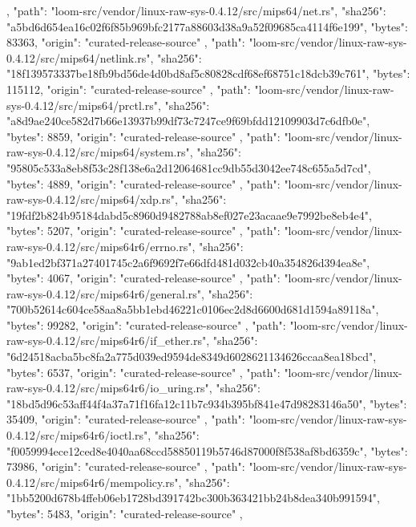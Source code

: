{{    },
    {
      "path": "loom-src/vendor/linux-raw-sys-0.4.12/src/mips64/net.rs",
      "sha256": "a5bd6d654ea16c02f6f85b969bfc2177a88603d38a9a52f09685ca4114f6e199",
      "bytes": 83363,
      "origin": "curated-release-source"
    },
    {
      "path": "loom-src/vendor/linux-raw-sys-0.4.12/src/mips64/netlink.rs",
      "sha256": "18f139573337be18fb9bd56de4d0bd8af5c80828cdf68ef68751c18dcb39c761",
      "bytes": 115112,
      "origin": "curated-release-source"
    },
    {
      "path": "loom-src/vendor/linux-raw-sys-0.4.12/src/mips64/prctl.rs",
      "sha256": "a8d9ae240ce582d7b66e13937b99df73c7247ce9f69bfdd12109903d7c6dfb0e",
      "bytes": 8859,
      "origin": "curated-release-source"
    },
    {
      "path": "loom-src/vendor/linux-raw-sys-0.4.12/src/mips64/system.rs",
      "sha256": "95805c533a8eb8f53c28f138e6a2d12064681cc9db55d3042ee748c655a5d7cd",
      "bytes": 4889,
      "origin": "curated-release-source"
    },
    {
      "path": "loom-src/vendor/linux-raw-sys-0.4.12/src/mips64/xdp.rs",
      "sha256": "19fdf2b824b95184dabd5c8960d9482788ab8ef027e23acaae9e7992be8eb4e4",
      "bytes": 5207,
      "origin": "curated-release-source"
    },
    {
      "path": "loom-src/vendor/linux-raw-sys-0.4.12/src/mips64r6/errno.rs",
      "sha256": "9ab1ed2bf371a27401745c2a6f9692f7e66dfd481d032cb40a354826d394ea8e",
      "bytes": 4067,
      "origin": "curated-release-source"
    },
    {
      "path": "loom-src/vendor/linux-raw-sys-0.4.12/src/mips64r6/general.rs",
      "sha256": "700b52614c604ce58aa8a5bb1ebd46221c0106ec2d8d6600d681d1594a89118a",
      "bytes": 99282,
      "origin": "curated-release-source"
    },
    {
      "path": "loom-src/vendor/linux-raw-sys-0.4.12/src/mips64r6/if_ether.rs",
      "sha256": "6d24518acba5bc8fa2a775d039ed9594de8349d6028621134626ccaa8ea18bcd",
      "bytes": 6537,
      "origin": "curated-release-source"
    },
    {
      "path": "loom-src/vendor/linux-raw-sys-0.4.12/src/mips64r6/io_uring.rs",
      "sha256": "18bd5d96c53aff44f4a37a71f16fa12c11b7c934b395bf841e47d98283146a50",
      "bytes": 35409,
      "origin": "curated-release-source"
    },
    {
      "path": "loom-src/vendor/linux-raw-sys-0.4.12/src/mips64r6/ioctl.rs",
      "sha256": "f0059994ece12ced8e4040aa68ccd58850119b5746d87000f8f538af8bd6359c",
      "bytes": 73986,
      "origin": "curated-release-source"
    },
    {
      "path": "loom-src/vendor/linux-raw-sys-0.4.12/src/mips64r6/mempolicy.rs",
      "sha256": "1bb5200d678b4ffeb06eb1728bd391742bc300b363421bb24b8dea340b991594",
      "bytes": 5483,
      "origin": "curated-release-source"
    },
    {
}}
